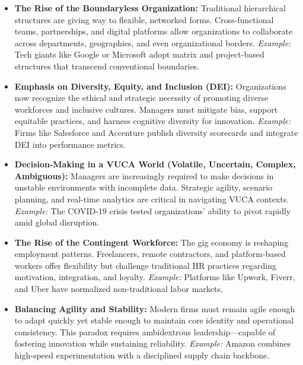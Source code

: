 \documentclass[10pt,a4paper]{book}
\begin{document}
\begin{itemize}

    \item \textbf{The Rise of the Boundaryless Organization:}  
    Traditional hierarchical structures are giving way to flexible, networked forms. Cross-functional teams, partnerships, and digital platforms allow organizations to collaborate across departments, geographies, and even organizational borders.  
    \textit{Example:} Tech giants like Google or Microsoft adopt matrix and project-based structures that transcend conventional boundaries.

    \item \textbf{Emphasis on Diversity, Equity, and Inclusion (DEI):}  
    Organizations now recognize the ethical and strategic necessity of promoting diverse workforces and inclusive cultures. Managers must mitigate bias, support equitable practices, and harness cognitive diversity for innovation.  
    \textit{Example:} Firms like Salesforce and Accenture publish diversity scorecards and integrate DEI into performance metrics.

    \item \textbf{Decision-Making in a VUCA World (Volatile, Uncertain, Complex, Ambiguous):}  
    Managers are increasingly required to make decisions in unstable environments with incomplete data. Strategic agility, scenario planning, and real-time analytics are critical in navigating VUCA contexts.  
    \textit{Example:} The COVID-19 crisis tested organizations' ability to pivot rapidly amid global disruption.

    \item \textbf{The Rise of the Contingent Workforce:}  
    The gig economy is reshaping employment patterns. Freelancers, remote contractors, and platform-based workers offer flexibility but challenge traditional HR practices regarding motivation, integration, and loyalty.  
    \textit{Example:} Platforms like Upwork, Fiverr, and Uber have normalized non-traditional labor markets.

    \item \textbf{Balancing Agility and Stability:}  
    Modern firms must remain agile enough to adapt quickly yet stable enough to maintain core identity and operational consistency. This paradox requires ambidextrous leadership—capable of fostering innovation while sustaining reliability.  
    \textit{Example:} Amazon combines high-speed experimentation with a disciplined supply chain backbone.


\end{itemize}
\end{document}
